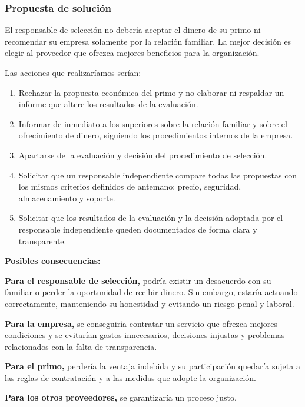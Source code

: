 \documentclass[12pt,a4paper,oneside]{article}
\newcommand{\rotulo}[1]{\par\Needspace{5\baselineskip}\noindent\textbf{#1}\par\nobreak}
\begin{document}
\subsubsection{Propuesta de solución}

El responsable de selección no debería aceptar el dinero de su primo ni recomendar su empresa solamente por la relación familiar. La mejor decisión es elegir al proveedor que ofrezca mejores beneficios para la organización.

Las acciones que realizaríamos serían:

\begin{enumerate}[leftmargin=1.8em,itemsep=3pt]
    \item Rechazar la propuesta económica del primo y no elaborar ni respaldar un informe que altere los resultados de la evaluación.
    \item Informar de inmediato a los superiores sobre la relación familiar y sobre el ofrecimiento de dinero, siguiendo los procedimientos internos de la empresa.
    \item Apartarse de la evaluación y decisión del procedimiento de selección.
    \item Solicitar que un responsable independiente compare todas las propuestas con los mismos criterios definidos de antemano: precio, seguridad, almacenamiento y soporte.
    \item Solicitar que los resultados de la evaluación y la decisión adoptada por el responsable independiente queden documentados de forma clara y transparente.
\end{enumerate}

\rotulo{Posibles consecuencias:}

\textbf{Para el responsable de selección,} podría existir un desacuerdo con su familiar o perder la oportunidad de recibir dinero. Sin embargo, estaría actuando correctamente, manteniendo su honestidad y evitando un riesgo penal y laboral.

\textbf{Para la empresa,} se conseguiría contratar un servicio que ofrezca mejores condiciones y se evitarían gastos innecesarios, decisiones injustas y problemas relacionados con la falta de transparencia.

\textbf{Para el primo,} perdería la ventaja indebida y su participación quedaría sujeta a las reglas de contratación y a las medidas que adopte la organización.

\textbf{Para los otros proveedores,} se garantizaría un proceso justo.
\end{document}
